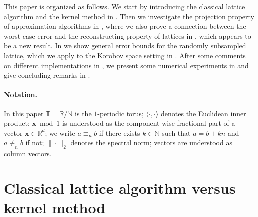 \documentclass[a4paper]{amsart}
\newcommand{\modone}{\bmod{}1}
\begin{document}
This paper is organized as follows.
We start by introducing the classical lattice algorithm and the kernel method in .
Then we investigate the projection property of approximation algorithms in , where we also prove a connection between the worst-case error and the reconstructing property of lattices in , which appears to be a new result.
In  we show general error bounds for the randomly subsampled lattice, which we apply to the Korobov space setting in .
After some comments on different implementations in , we present some numerical experiments in  and give concluding remarks in .

\vspace{5pt}
\paragraph{Notation.}
In this paper $\mathds T = \mathds R/\mathds N$ is the $1$-periodic torus;
$\langle\cdot,\cdot\rangle$ denotes the Euclidean inner product;
$\bm x\modone$ is understood as the component-wise fractional part of a vector $\bm x\in\mathds R^d$;
we write $a \equiv_n b$ if there exists $k\in\mathds N$ such that $a=b+kn$ and $a\not\equiv_n b$ if not;
$\|\cdot\|_{2}$ denotes the spectral norm;
vectors are understood as column vectors.
 \section{Classical lattice algorithm versus kernel method}\label{sec:classical}
\end{document}
